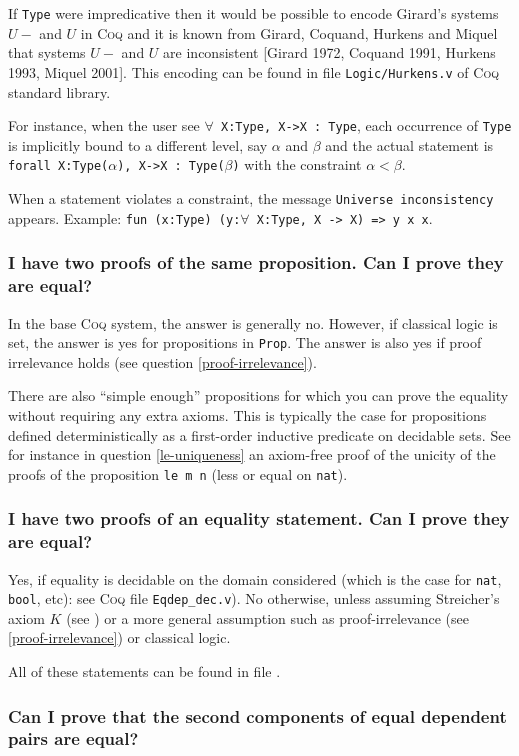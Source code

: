 \documentclass[a4paper,pdftex]{article}
\def\Question#1{\stepcounter{question}\subsubsection{#1}}
\def\Coq{\textsc{Coq}}
\newcommand{\coqimp}{{\mbox{\tt ->}}}
\def\Type{{\tt Type}}
\def\Prop{{\tt Prop}}
\newcommand\vfile[2]{\ahref{#1}{\tt {#2}.v}}
\begin{document}
If {\Type} were impredicative then it would be possible to encode
Girard's systems $U-$ and $U$ in {\Coq} and it is known from Girard,
Coquand, Hurkens and Miquel that systems $U-$ and $U$ are inconsistent
[Girard 1972, Coquand 1991, Hurkens 1993, Miquel 2001]. This encoding
can be found in file {\tt Logic/Hurkens.v} of {\Coq} standard library.

For instance, when the user see {\tt $\forall$ X:Type, X->X : Type}, each
occurrence of {\Type} is implicitly bound to a different level, say
$\alpha$ and $\beta$ and the actual statement is {\tt
forall X:Type($\alpha$), X->X : Type($\beta$)} with the constraint
$\alpha<\beta$.

When a statement violates a constraint, the message {\tt Universe
inconsistency} appears. Example: {\tt fun (x:Type) (y:$\forall$ X:Type, X
{\coqimp} X) => y x x}.

\Question{I have two proofs of the same proposition. Can I prove they are equal?}

In the base {\Coq} system, the answer is generally no. However, if
classical logic is set, the answer is yes for propositions in {\Prop}.
The answer is also yes if proof irrelevance holds (see question
\ref{proof-irrelevance}).

There are also ``simple enough'' propositions for which you can prove
the equality without requiring any extra axioms.  This is typically
the case for propositions defined deterministically as a first-order
inductive predicate on decidable sets. See for instance in question
\ref{le-uniqueness} an axiom-free proof of the unicity of the proofs of
the proposition {\tt le m n} (less or equal on {\tt nat}).


\Question{I have two proofs of an equality statement. Can I prove they are 
equal?}

 Yes, if equality is decidable on the domain considered (which
is the case for {\tt nat}, {\tt bool}, etc): see {\Coq} file
\verb=Eqdep_dec.v=). No otherwise, unless
assuming Streicher's axiom $K$ (see \cite{HofStr98}) or a more general
assumption such as proof-irrelevance (see \ref{proof-irrelevance}) or
classical logic.

All of these statements can be found in file \vfile{\LogicEqdep}{Eqdep}.

\Question{Can I prove that the second components of equal dependent
pairs are equal?}
\end{document}
